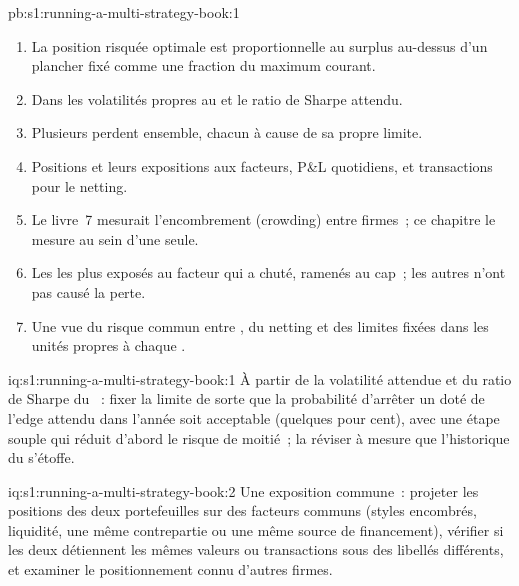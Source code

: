 \begin{solution}{pb:s1:running-a-multi-strategy-book:1}
\begin{enumerate}
à la moitié d'un ~; une  de 5~\% arrête 91.6~\% des  sains (ratio de Sharpe 0.7, volatilité de 10~\%) en moins d'un an.
\item La position risquée optimale est proportionnelle au surplus au-dessus d'un plancher fixé comme une fraction du maximum courant.
\item Dans les volatilités propres au  et le ratio de Sharpe attendu.
\item Plusieurs  perdent ensemble, chacun à cause de sa propre limite.
\item Positions et leurs expositions aux facteurs, P\&L quotidiens, et transactions pour le netting.
\item Le livre~7 mesurait l'encombrement (crowding) entre firmes~; ce chapitre le mesure au sein d'une seule.
\item Les  les plus exposés au facteur qui a chuté, ramenés au cap~; les autres n'ont pas causé la perte.
\item Une vue du risque commun entre , du netting et des limites fixées dans les unités propres à chaque .
\end{enumerate}
\end{solution}

\begin{solution}{iq:s1:running-a-multi-strategy-book:1}
À partir de la volatilité attendue et du ratio de Sharpe du ~: fixer la limite de sorte que la probabilité d'arrêter un  doté de l'edge attendu dans l'année soit
acceptable (quelques pour cent), avec une étape souple qui réduit d'abord le risque de moitié~; la réviser à mesure que l'historique du  s'étoffe.
\end{solution}

\begin{solution}{iq:s1:running-a-multi-strategy-book:2}
Une exposition commune~: projeter les positions des deux portefeuilles sur des facteurs communs (styles encombrés, liquidité, une même contrepartie ou une même source de financement), vérifier si les deux
détiennent les mêmes valeurs ou transactions sous des libellés différents, et examiner le positionnement connu d'autres firmes.
\end{solution}

